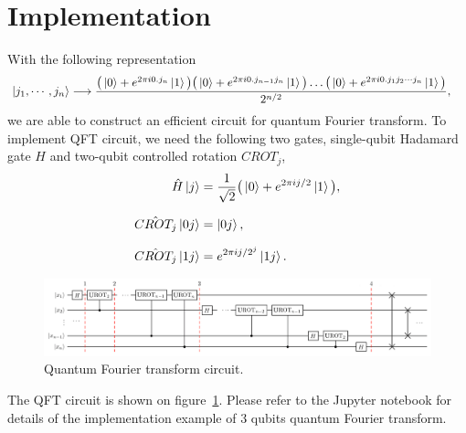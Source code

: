\documentclass[a4paper]{article}
\begin{document}
\section{Implementation}
\label{sec:Implement}
With the following representation
    \begin{equation} \label{eq:eq4}
    \setlength{\jot}{10pt}
    \begin{aligned}
        \ket{j_1, \cdots, j_n} &\longrightarrow   \frac { \big( \ket{0} + e^{2 \pi i 0.j_n} \ket{1} \big)   \big( \ket{0} + e^{2 \pi i 0.j_{n-1} j_n} \ket{1} \big)   \dotso   \big( \ket{0} + e^{2 \pi i 0.j_1 j_2 \cdots j_n} \ket{1} \big) } {2^{n/2}},
    \end{aligned}
    \end{equation}
we are able to construct an efficient circuit for quantum Fourier transform. To implement QFT circuit, we need the following two gates, single-qubit Hadamard gate $H$ and two-qubit controlled rotation $CROT_j$,
    \begin{equation} \label{eq:eq5}
    \setlength{\jot}{10pt}
    \begin{aligned}
        \hat{H} \ket{j}   &=   \frac{1}{\sqrt{2}}   \big( \ket{0}   +   e^{2 \pi i j/2 } \ket{1} \big), \\
        \hat{CROT_j} \ket{0j}   &=   \ket{0j}, \\
        \hat{CROT_j} \ket{1j}   &=   e^{2 \pi i j / 2^j} \ket{1j}.
    \end{aligned}
    \end{equation}
    
    \begin{figure}	
        \centering
            \includegraphics [width=\textwidth, height=\textheight, keepaspectratio] {qft.png}
        \caption{Quantum Fourier transform circuit.}
        \label{fig:qft}
    \end{figure}

The QFT circuit is shown on figure~\ref{fig:qft}. Please refer to the Jupyter notebook for details of the implementation example of 3 qubits quantum Fourier transform.
\end{document}
